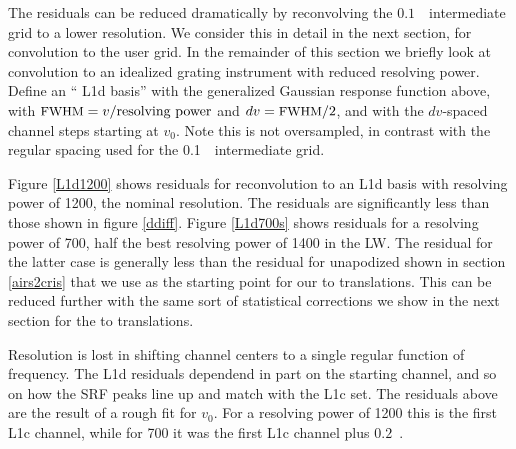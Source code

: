 \documentclass[11pt]{article}
\begin{document}

The residuals can be reduced dramatically by reconvolving the
$0.1$~\wn\ intermediate grid to a lower resolution.  We consider this
in detail in the next section, for convolution to the {\cris} user
grid.  In the remainder of this section we briefly look at
convolution to an idealized grating instrument with reduced resolving
power.  Define an ``{\airs} L1d basis'' with the generalized Gaussian
response function above, with $\mbox{\small FWHM} = v / \hbox{resolving power}$ and
$dv = \mbox{\small FWHM} / 2$, and with the $dv$-spaced channel steps starting at
$v_0$.  Note this is not oversampled, in contrast with the regular
spacing used for the 0.1~\wn\ intermediate grid.


Figure \ref{L1d1200} shows residuals for reconvolution to an L1d
basis with resolving power of 1200, the nominal {\airs} resolution.
The residuals are significantly less than those shown in figure
\ref{ddiff}.  Figure \ref{L1d700s} shows residuals for a resolving
power of 700, half the best {\airs} resolving power of 1400 in the
LW.  The residual for the latter case is generally less than the
residual for unapodized {\cris} shown in section \ref{airs2cris} that
we use as the starting point for our {\airs} to {\cris} translations.
This can be reduced further with the same sort of statistical
corrections we show in the next section for the {\airs} to {\cris}
translations.  

Resolution is lost in shifting channel centers to a single regular
function of frequency.  The L1d residuals dependend in part on the
starting channel, and so on how the SRF peaks line up and match with
the L1c set.  The residuals above are the result of a rough fit for
$v_0$.  For a resolving power of 1200 this is the first L1c channel,
while for 700 it was the first L1c channel plus $0.2$~\wn.
\end{document}
